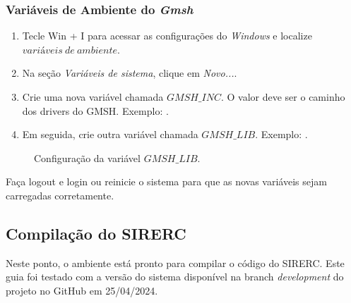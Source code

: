 \documentclass[a4paper,11pt]{article}
\newcommand{\sistema}{\textsf{SIRERC}}
\newcommand{\gmsh}{\textit{Gmsh}}
\newcommand{\windows}{\textit{Windows}}
\begin{document}
\subsubsection{Variáveis de Ambiente do \gmsh{}}

	\begin{enumerate}
		\item Tecle Win + I para acessar as configurações do \windows{} e localize $variáveis\ de\ ambiente$.
		\item Na seção \textit{Variáveis de sistema}, clique em \textit{Novo...}.
		\item Crie uma nova variável chamada $GMSH\_INC$. O valor deve ser o caminho dos drivers do GMSH. Exemplo: .
		\item Em seguida, crie outra variável chamada $GMSH\_LIB$. Exemplo: .
	\end{enumerate}
	
\begin{figure}[H]
	\centering
	\caption{Configuração da variável $GMSH\_LIB$.}
	\label{fig:gmsh_lib}
\end{figure}
	
Faça logout e login ou reinicie o sistema para que as novas variáveis sejam carregadas corretamente.

\subsection{Compilação do \sistema{}}

Neste ponto, o ambiente está pronto para compilar o código do \sistema{}. Este guia foi testado com a versão do sistema disponível na branch \emph{development} do projeto no GitHub em 25/04/2024.
\end{document}
